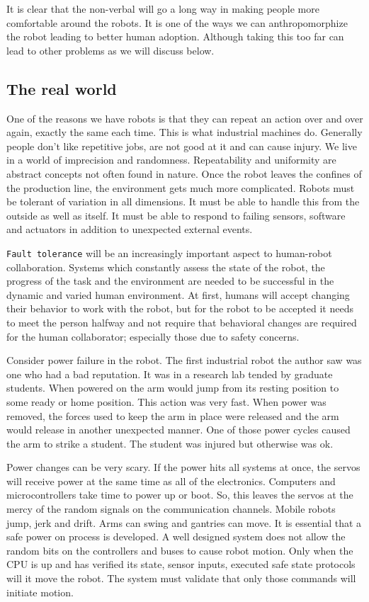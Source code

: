 It is clear that the non-verbal will go a long way in making people more
comfortable around the robots. It is one of the ways we can
anthropomorphize the robot leading to better human adoption. Although
taking this too far can lead to other problems as we will discuss below.

\hypertarget{the-real-world}{%
\subsection{The real world}\label{the-real-world}}

One of the reasons we have robots is that they can repeat an action over
and over again, exactly the same each time. This is what industrial
machines do. Generally people don't like repetitive jobs, are not good
at it and can cause injury. We live in a world of imprecision and
randomness. Repeatability and uniformity are abstract concepts not often
found in nature. Once the robot leaves the confines of the production
line, the environment gets much more complicated. Robots must be
tolerant of variation in all dimensions. It must be able to handle this
from the outside as well as itself. It must be able to respond to
failing sensors, software and actuators in addition to unexpected
external events.

\texttt{Fault\ tolerance} will be an increasingly important aspect to
human-robot collaboration. Systems which constantly assess the state of
the robot, the progress of the task and the environment are needed to be
successful in the dynamic and varied human environment. At first, humans
will accept changing their behavior to work with the robot, but for the
robot to be accepted it needs to meet the person halfway and not require
that behavioral changes are required for the human collaborator;
especially those due to safety concerns.

Consider power failure in the robot. The first industrial robot the
author saw was one who had a bad reputation. It was in a research lab
tended by graduate students. When powered on the arm would jump from its
resting position to some ready or home position. This action was very
fast. When power was removed, the forces used to keep the arm in place
were released and the arm would release in another unexpected manner.
One of those power cycles caused the arm to strike a student. The
student was injured but otherwise was ok.

Power changes can be very scary. If the power hits all systems at once,
the servos will receive power at the same time as all of the
electronics. Computers and microcontrollers take time to power up or
boot. So, this leaves the servos at the mercy of the random signals on
the communication channels. Mobile robots jump, jerk and drift. Arms can
swing and gantries can move. It is essential that a safe power on
process is developed. A well designed system does not allow the random
bits on the controllers and buses to cause robot motion. Only when the
CPU is up and has verified its state, sensor inputs, executed safe state
protocols will it move the robot. The system must validate that only
those commands will initiate motion.

